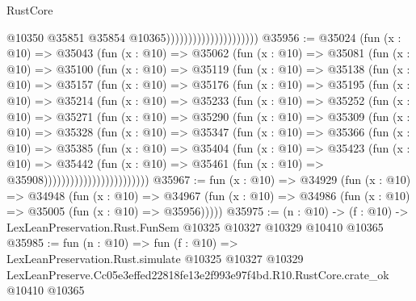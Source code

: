 \begin{lexlean}{RustCore}
\begin{coremodule}
                                              @10350
                                              @35851
                                              @35854
                                              @10365)))))))))))))))))))))
@35956 := @35024
    (fun (x : @10) =>
    @35043
      (fun (x : @10) =>
      @35062
        (fun (x : @10) =>
        @35081
          (fun (x : @10) =>
          @35100
            (fun (x : @10) =>
            @35119
              (fun (x : @10) =>
              @35138
                (fun (x : @10) =>
                @35157
                  (fun (x : @10) =>
                  @35176
                    (fun (x : @10) =>
                    @35195
                      (fun (x : @10) =>
                      @35214
                        (fun (x : @10) =>
                        @35233
                          (fun (x : @10) =>
                          @35252
                            (fun (x : @10) =>
                            @35271
                              (fun (x : @10) =>
                              @35290
                                (fun (x : @10) =>
                                @35309
                                  (fun (x : @10) =>
                                  @35328
                                    (fun (x : @10) =>
                                    @35347
                                      (fun (x : @10) =>
                                      @35366
                                        (fun (x : @10) =>
                                        @35385
                                          (fun (x : @10) =>
                                          @35404
                                            (fun (x : @10) =>
                                            @35423
                                              (fun (x : @10) =>
                                              @35442
                                                (fun (x : @10) =>
                                                @35461
                                                  (fun (x : @10) => @35908))))))))))))))))))))))))
@35967 := fun (x : @10) =>
  @34929
    (fun (x : @10) =>
    @34948
      (fun (x : @10) =>
      @34967 (fun (x : @10) => @34986 (fun (x : @10) => @35005 (fun (x : @10) => @35956)))))
@35975 := (n : @10) ->
  (f : @10) -> LexLeanPreservation.Rust.FunSem @10325 @10327 @10329 @10410 @10365
@35985 := fun (n : @10) =>
  fun (f : @10) =>
  LexLeanPreservation.Rust.simulate
    @10325
    @10327
    @10329
    LexLeanPreserve.Cc05e3effed22818fe13e2f993e97f4bd.R10.RustCore.crate_ok
    @10410
    @10365
\end{coremodule}
\end{lexlean}

